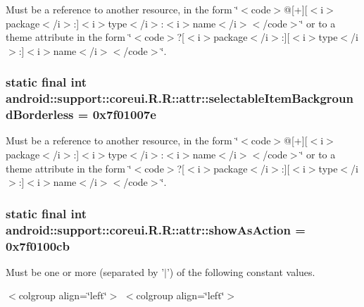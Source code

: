 Must be a reference to another resource, in the form \char`\"{}$<$code$>$@\mbox{[}+\mbox{]}\mbox{[}$<$i$>$package$<$/i$>$:\mbox{]}$<$i$>$type$<$/i$>$:$<$i$>$name$<$/i$>$$<$/code$>$\char`\"{} or to a theme attribute in the form \char`\"{}$<$code$>$?\mbox{[}$<$i$>$package$<$/i$>$:\mbox{]}\mbox{[}$<$i$>$type$<$/i$>$:\mbox{]}$<$i$>$name$<$/i$>$$<$/code$>$\char`\"{}. \hypertarget{classandroid_1_1support_1_1coreui_1_1_r_1_1attr_861a676eab5062d7989080764849636e}{
\subsubsection[{selectableItemBackgroundBorderless}]{\setlength{\rightskip}{0pt plus 5cm}static final int android::support::coreui.R.R::attr::selectableItemBackgroundBorderless = 0x7f01007e}}
\label{classandroid_1_1support_1_1coreui_1_1_r_1_1attr_861a676eab5062d7989080764849636e}


Must be a reference to another resource, in the form \char`\"{}$<$code$>$@\mbox{[}+\mbox{]}\mbox{[}$<$i$>$package$<$/i$>$:\mbox{]}$<$i$>$type$<$/i$>$:$<$i$>$name$<$/i$>$$<$/code$>$\char`\"{} or to a theme attribute in the form \char`\"{}$<$code$>$?\mbox{[}$<$i$>$package$<$/i$>$:\mbox{]}\mbox{[}$<$i$>$type$<$/i$>$:\mbox{]}$<$i$>$name$<$/i$>$$<$/code$>$\char`\"{}. \hypertarget{classandroid_1_1support_1_1coreui_1_1_r_1_1attr_8c2d1aae94df0eaff319aa42878d86cd}{
\subsubsection[{showAsAction}]{\setlength{\rightskip}{0pt plus 5cm}static final int android::support::coreui.R.R::attr::showAsAction = 0x7f0100cb}}
\label{classandroid_1_1support_1_1coreui_1_1_r_1_1attr_8c2d1aae94df0eaff319aa42878d86cd}


Must be one or more (separated by '$|$') of the following constant values. \begin{TabularC}{0}
\hline
\end{TabularC}
$<$colgroup align=\char`\"{}left\char`\"{}$>$ $<$colgroup align=\char`\"{}left\char`\"{}$>$ 

